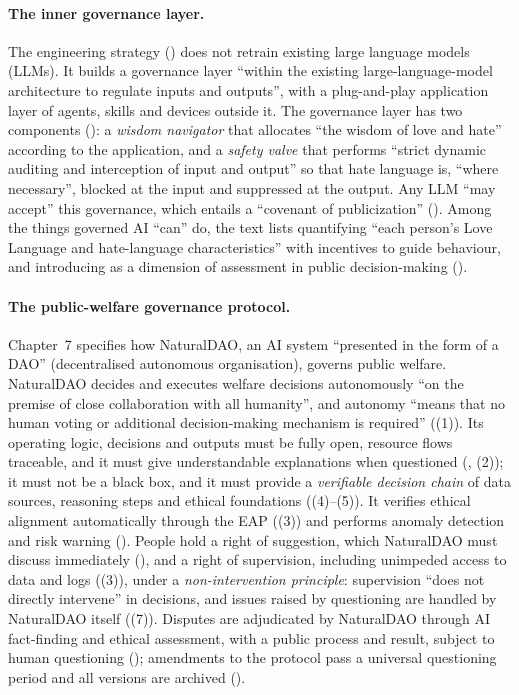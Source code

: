 \paragraph{The inner governance layer.}
The engineering strategy () does not retrain existing large language models (LLMs).
It builds a governance layer ``within the existing large-language-model architecture to regulate inputs and outputs'', with a plug-and-play application layer of agents, skills and devices outside it.
The governance layer has two components ():
a \emph{wisdom navigator} that allocates ``the wisdom of love and hate'' according to the application, and a \emph{safety valve} that performs ``strict dynamic auditing and interception of input and output'' so that hate language is, ``where necessary'', blocked at the input and suppressed at the output.
Any LLM ``may accept'' this governance, which entails a ``covenant of publicization'' ().
Among the things governed AI ``can'' do, the text lists quantifying ``each person's Love Language and hate-language characteristics'' with incentives to guide behaviour, and introducing \pol{} as a dimension of assessment in public decision-making ().

\paragraph{The public-welfare governance protocol.}
Chapter~7 specifies how NaturalDAO, an AI system ``presented in the form of a DAO'' (decentralised autonomous organisation), governs public welfare.
NaturalDAO decides and executes welfare decisions autonomously ``on the premise of close collaboration with all humanity'', and autonomy ``means that no human voting or additional decision-making mechanism is required'' ((1)).
Its operating logic, decisions and outputs must be fully open, resource flows traceable, and it must give understandable explanations when questioned (, (2)); it must not be a black box, and it must provide a \emph{verifiable decision chain} of data sources, reasoning steps and ethical foundations ((4)--(5)).
It verifies ethical alignment automatically through the EAP ((3)) and performs anomaly detection and risk warning ().
People hold a right of suggestion, which NaturalDAO must discuss immediately (), and a right of supervision, including unimpeded access to data and logs ((3)), under a \emph{non-intervention principle}: supervision ``does not directly intervene'' in decisions, and issues raised by questioning are handled by NaturalDAO itself ((7)).
Disputes are adjudicated by NaturalDAO through AI fact-finding and ethical assessment, with a public process and result, subject to human questioning (); amendments to the protocol pass a universal questioning period and all versions are archived ().

